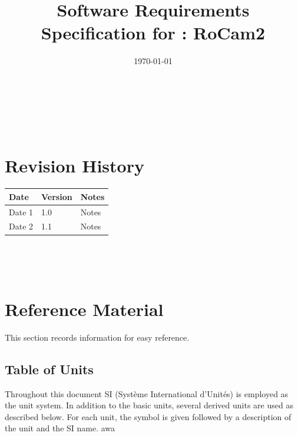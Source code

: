 \documentclass[12pt]{article}
\begin{document}
\title{Software Requirements Specification for \progname: RoCam2}
\author{\authname}
\date{\today}

\maketitle

~\newpage


\tableofcontents

~\newpage

\section*{Revision History}

\begin{tabularx}{\textwidth}{p{3cm}p{2cm}X}
  \toprule {\bf Date} & {\bf Version} & {\bf Notes} \\
  \midrule
  Date 1              & 1.0           & Notes       \\
  Date 2              & 1.1           & Notes       \\
  \bottomrule
\end{tabularx}

~\\

~\newpage

\section{Reference Material}

This section records information for easy reference.

\subsection{Table of Units}

Throughout this document SI (Syst\`{e}me International d'Unit\'{e}s) is employed as the unit system. In addition to the basic units, several derived
units are used as described below. For each unit, the symbol is given followed
by a description of the unit and the SI name. awa ~\newline
\end{document}
